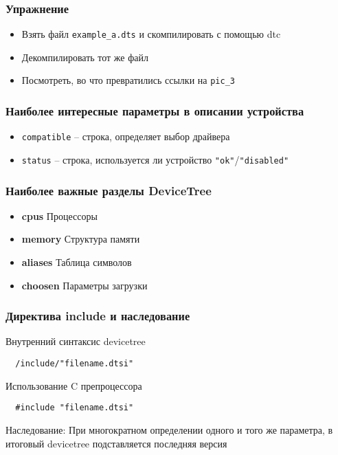 \begin{frame}
  \frametitle{Упражнение}
  \begin{itemize}
    \item Взять файл \texttt{example\_a.dts} и скомпилировать с помощью dtc
    \item Декомпилировать тот же файл
    \item Посмотреть, во что превратились ссылки на \texttt{pic\_3} 
  \end{itemize}
\end{frame}

\begin{frame}
  \frametitle{Наиболее интересные параметры в описании устройства}
  \begin{itemize}
    \item \texttt{compatible} -- строка, определяет выбор драйвера
    \item \texttt{status} -- строка, используется ли устройство \texttt{"ok"}/\texttt{"disabled"}
  \end{itemize}
\end{frame}

\begin{frame}
  \frametitle{Наиболее важные разделы DeviceTree}
  \begin{itemize}
    \item \textbf{cpus} Процессоры
    \item \textbf{memory} Структура памяти
    \item \textbf{aliases} Таблица символов
    \item \textbf{choosen} Параметры загрузки
  \end{itemize}
\end{frame}

\begin{frame}[fragile]
  \frametitle{Директива include и наследование}
  \begin{center}
    Внутренний синтаксис devicetree
  \end{center}
  \begin{lstlisting}
  /include/"filename.dtsi"
  \end{lstlisting}
  \begin{center}
    Использование C препроцессора
  \end{center}
  \begin{lstlisting}
  #include "filename.dtsi"
  \end{lstlisting}
  \begin{center}
    Наследование: При многократном определении одного и того же параметра, в итоговый devicetree подставляется последняя версия 
  \end{center}
\end{frame}

